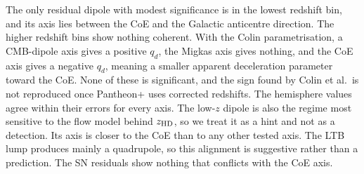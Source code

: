 \documentclass[10pt,twocolumn,letterpaper]{article}
\begin{document}
The only residual dipole with modest significance is in the lowest redshift bin, and its axis lies between the CoE and the Galactic anticentre direction. The higher redshift bins show nothing coherent. With the Colin parametrisation, a CMB-dipole axis gives a positive $q_d$, the Migkas axis gives nothing, and the CoE axis gives a negative $q_d$, meaning a smaller apparent deceleration parameter toward the CoE. None of these is significant, and the sign found by Colin et al.\ is not reproduced once Pantheon+ uses corrected redshifts. The hemisphere values agree within their errors for every axis. The low-$z$ dipole is also the regime most sensitive to the flow model behind $z_{\rm HD}$, so we treat it as a hint and not as a detection. Its axis is closer to the CoE than to any other tested axis. The LTB lump produces mainly a quadrupole, so this alignment is suggestive rather than a prediction. The SN residuals show nothing that conflicts with the CoE axis.

\begin{table}[htbp]\centering\footnotesize
\caption{Residual dipoles from Eq.~(\ref{eq:dip}) with the full covariance. $A$ is the dipole amplitude in magnitudes (positive means more distant than the model), $\delta\theta_{68}$ the 68\% direction uncertainty, $\theta_{\rm CoE}$ the angle from the CoE, and $\Delta\chi^2$ the improvement over no dipole for three extra parameters.}\label{tab:dip}
\setlength{\tabcolsep}{2.2pt}
\end{table}

\begin{table}[htbp]\centering\footnotesize
\caption{Deceleration-parameter anisotropy from the cosmographic expansion with $z<0.8$. Columns 3--6 are the fit of Eq.~(\ref{eq:colin}) with $j_0$ free, and $\Delta\chi^2$ is its improvement over $q_d=0$. The last four columns give $q_0$ with $j_0=1$ in the hemisphere toward the axis and in the opposite one. The last axis is the $\Lambda$CDM residual dipole of Table~\ref{tab:dip}, so its $\Delta\chi^2$ carries a look-elsewhere penalty.}\label{tab:q}
\setlength{\tabcolsep}{1.6pt}
\end{table}
\end{document}

